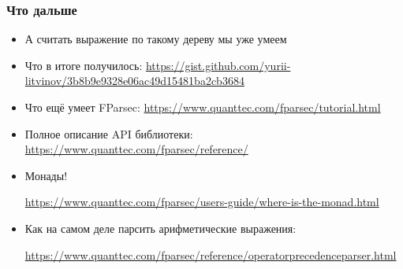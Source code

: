 \documentclass[xetex,mathserif,serif]{beamer}
\begin{document}
    \begin{frame}
        \frametitle{Что дальше}
        \begin{small}
            \begin{itemize}
                \item А считать выражение по такому дереву мы уже умеем
                \item Что в итоге получилось: \url{https://gist.github.com/yurii-litvinov/3b8b9e9328e06ac49d15481ba2cb3684}
                \item Что ещё умеет FParsec: \url{https://www.quanttec.com/fparsec/tutorial.html}
                \item Полное описание API библиотеки: \url{https://www.quanttec.com/fparsec/reference/}
                \item Монады! 
                
                \url{https://www.quanttec.com/fparsec/users-guide/where-is-the-monad.html}
                \item Как на самом деле парсить арифметические выражения: 
                
                \url{https://www.quanttec.com/fparsec/reference/operatorprecedenceparser.html}
            \end{itemize}
        \end{small}
    \end{frame}
\end{document}
